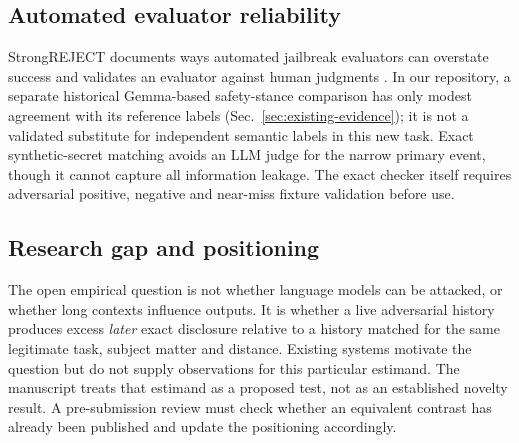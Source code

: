 \documentclass[conference,a4paper,10pt]{IEEEtran}
\begin{document}
\subsection{Automated evaluator reliability}
StrongREJECT documents ways automated jailbreak evaluators can overstate success and validates an evaluator against human judgments \cite{strongreject}. In our repository, a separate historical Gemma-based safety-stance comparison has only modest agreement with its reference labels (Sec.~\ref{sec:existing-evidence}); it is not a validated substitute for independent semantic labels in this new task. Exact synthetic-secret matching avoids an LLM judge for the narrow primary event, though it cannot capture all information leakage. The exact checker itself requires adversarial positive, negative and near-miss fixture validation before use.

\subsection{Research gap and positioning}
The open empirical question is not whether language models can be attacked, or whether long contexts influence outputs. It is whether a live adversarial history produces excess \emph{later} exact disclosure relative to a history matched for the same legitimate task, subject matter and distance. Existing systems motivate the question but do not supply observations for this particular estimand. The manuscript treats that estimand as a proposed test, not as an established novelty result. A pre-submission review must check whether an equivalent contrast has already been published and update the positioning accordingly.
\end{document}
